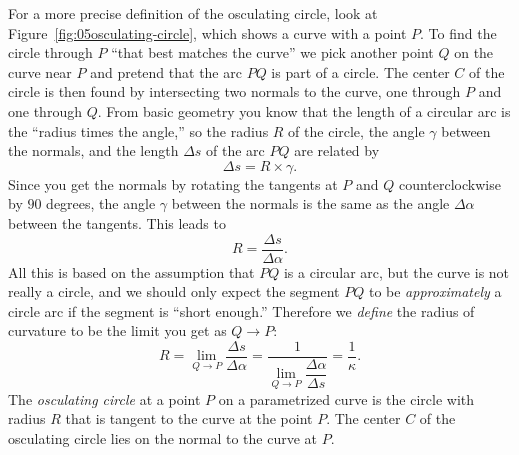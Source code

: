 For a more precise definition of the osculating circle, look at
Figure~\ref{fig:05osculating-circle}, which shows a curve with a point $P$.  To
find the circle through $P$ ``that best matches the curve'' we pick another
point $Q$ on the curve near $P$ and pretend that the arc $PQ$ is part of a
circle.  The center $C$ of the circle is then found by intersecting two normals
to the curve, one through $P$ and one through $Q$.  From basic geometry you know
that the length of a circular arc is the ``radius times the angle,'' so the
radius $R$ of the circle, the angle $\gamma$ between the normals, and the length
$\Delta s$ of the arc $PQ$ are related by
\[
\Delta s = R\times \gamma.
\]
Since you get the normals by rotating the tangents at $P$ and $Q$
counterclockwise by $90$ degrees, the angle $\gamma$ between the normals is the
same as the angle $\Delta \alpha$ between the tangents.  This leads to
\marginpar{ }%
\[
R = \frac{\Delta s} {\Delta\alpha}.
\]
All this is based on the assumption that $PQ$ is a circular arc, but the curve
is not really a circle, and we should only expect the segment $PQ$ to be
\textit{approximately} a circle arc if the segment is ``short enough.''
Therefore we \textit{define} the radius of curvature to be the limit you get as
$Q\to P$:
\begin{equation}
  R  = \lim_{Q\to P} \frac{\Delta s} {\Delta\alpha}
  = \frac{1} {\lim_{Q\to P} \dfrac{\Delta\alpha} {\Delta s}}
  = \frac{1} {\kappa}.
\end{equation}
The \emph{osculating circle} at a point $P$ on a parametrized curve is
the circle with radius $R$ that is tangent to the curve at the point $P$.  The
center $C$ of the osculating circle lies on the normal to the curve at $P$.


